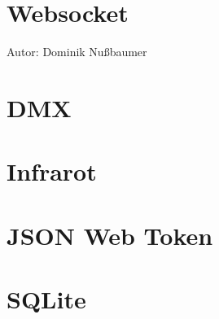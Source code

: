 \documentclass[
    headings=optiontotocandhead,%
    twoside,
    numbers=noenddot,%
    toc=flat, %
    12pt, %
    titlepage, %
    parskip=full, %
    listof=totoc, %
    listof=flat, %
    numbers=noenddot, %
    bibliography=totoc, %
    a4paper,DIV=14,
    BCOR=15mm,
]{scrbook}
\begin{document}
\renewcommand{\kapitelautor}{Autor: Clemens Scharwitzl}



\section{Websocket}\label{Websocket}

\renewcommand{\kapitelautor}{Autor: Dominik Nußbaumer, Clemens Scharwitzl}

    {Autor: Dominik Nußbaumer}

\section{DMX}\label{DMX}

\renewcommand{\kapitelautor}{Autor: Clemens Scharwitzl}

    

\section{Infrarot}\label{Infrarot}

\renewcommand{\kapitelautor}{Autor: Clemens Scharwitzl}

    

\section{JSON Web Token}\label{JWT}

\renewcommand{\kapitelautor}{Autor: Clemens Scharwitzl}

    

\section{SQLite}\label{SQLite}

\renewcommand{\kapitelautor}{Autor: Clemens Scharwitzl}

    


\end{document}
